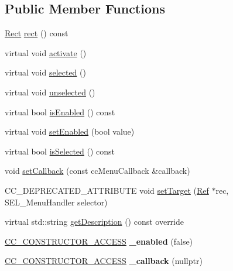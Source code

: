 \subsection*{Public Member Functions}
\begin{DoxyCompactItemize}
\item 
\hyperlink{classRect}{Rect} \hyperlink{classMenuItem_a3d6b05193856cc8d5e5e2a2d98736e4c}{rect} () const
\item 
virtual void \hyperlink{classMenuItem_a2c5e2d7641bbf1dc9da877557c6c5e92}{activate} ()
\item 
virtual void \hyperlink{classMenuItem_aa0330b2c1e2066eb7eee87ade6e6740f}{selected} ()
\item 
virtual void \hyperlink{classMenuItem_a3abeecc6d59ada50f4123e3e36ae4892}{unselected} ()
\item 
virtual bool \hyperlink{classMenuItem_a893ac64d6895430aa4ec34bc3051f900}{is\+Enabled} () const
\item 
virtual void \hyperlink{classMenuItem_abe370fd6258192233b6bd9534344773b}{set\+Enabled} (bool value)
\item 
virtual bool \hyperlink{classMenuItem_ac7e4669ecbc27decbb181f1ad2db7817}{is\+Selected} () const
\item 
void \hyperlink{classMenuItem_a313b2ac1d809dea921aacc47ad8aef0f}{set\+Callback} (const cc\+Menu\+Callback \&callback)
\item 
C\+C\+\_\+\+D\+E\+P\+R\+E\+C\+A\+T\+E\+D\+\_\+\+A\+T\+T\+R\+I\+B\+U\+TE void \hyperlink{classMenuItem_aabf9ed107f5128035c62f5556f7b8af9}{set\+Target} (\hyperlink{classRef}{Ref} $\ast$rec, S\+E\+L\+\_\+\+Menu\+Handler selector)
\item 
virtual std\+::string \hyperlink{classMenuItem_a47f8424575b4f223520d236dda34c3db}{get\+Description} () const override
\item 
\mbox{\label{classMenuItem_a6902987db7236178cfe51db03c4f648a}} 
\hyperlink{_2cocos2d_2cocos_2base_2ccConfig_8h_a25ef1314f97c35a2ed3d029b0ead6da0}{C\+C\+\_\+\+C\+O\+N\+S\+T\+R\+U\+C\+T\+O\+R\+\_\+\+A\+C\+C\+E\+SS} {\bfseries \+\_\+enabled} (false)
\item 
\mbox{\label{classMenuItem_a16534749a52ad7bdadc76de169a662e8}} 
\hyperlink{_2cocos2d_2cocos_2base_2ccConfig_8h_a25ef1314f97c35a2ed3d029b0ead6da0}{C\+C\+\_\+\+C\+O\+N\+S\+T\+R\+U\+C\+T\+O\+R\+\_\+\+A\+C\+C\+E\+SS} {\bfseries \+\_\+callback} (nullptr)
\item 

\end{DoxyCompactItemize}
